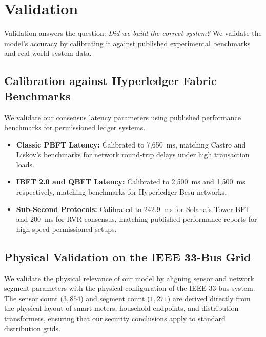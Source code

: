 \documentclass[12pt, oneside, a4paper]{report}
\theoremstyle{definition}
\theoremstyle{remark}
\begin{document}
\section{Validation}
\label{sec:vv:validation}

Validation answers the question: \emph{Did we build the correct system?} We validate the model's accuracy by calibrating it against published experimental benchmarks and real-world system data.

\subsection{Calibration against Hyperledger Fabric Benchmarks}
We validate our consensus latency parameters using published performance benchmarks for permissioned ledger systems.
\begin{itemize}
  \item \textbf{Classic PBFT Latency:} Calibrated to 7,650~ms, matching Castro and Liskov's benchmarks for network round-trip delays under high transaction loads.
  \item \textbf{IBFT 2.0 and QBFT Latency:} Calibrated to 2,500~ms and 1,500~ms respectively, matching benchmarks for Hyperledger Besu networks.
  \item \textbf{Sub-Second Protocols:} Calibrated to 242.9~ms for Solana's Tower BFT and 200~ms for RVR consensus, matching published performance reports for high-speed permissioned setups.
\end{itemize}

\subsection{Physical Validation on the IEEE 33-Bus Grid}
We validate the physical relevance of our model by aligning sensor and network segment parameters with the physical configuration of the IEEE 33-bus system. The sensor count ($3{,}854$) and segment count ($1{,}271$) are derived directly from the physical layout of smart meters, household endpoints, and distribution transformers, ensuring that our security conclusions apply to standard distribution grids.
\end{document}
